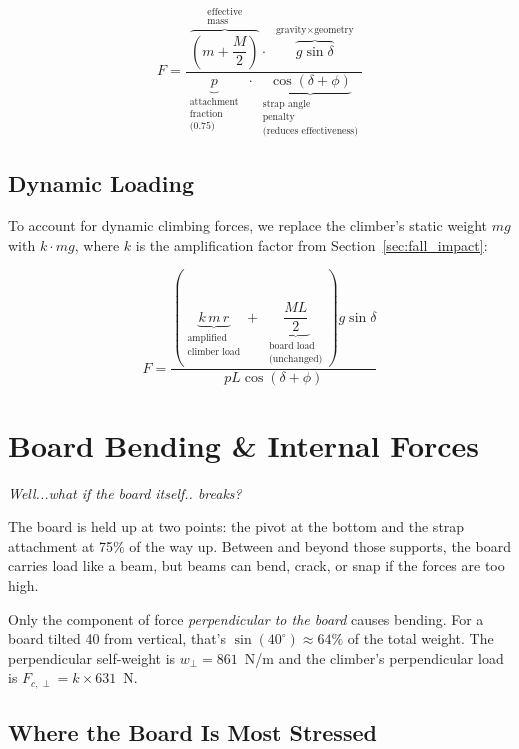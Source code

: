\documentclass[12pt]{article}
\begin{document}
\[
\boxed{
F = \frac{
\overbrace{\left(m + \dfrac{M}{2}\right)}^{\substack{\text{effective}\\\text{mass}}}
\cdot\;
\overbrace{g \sin\delta}^{\substack{\text{gravity} \times \text{geometry}}}
}{
\underbrace{p}_{\substack{\text{attachment}\\\text{fraction}\\\text{(0.75)}}}
\;\cdot\;
\underbrace{\cos(\delta+\phi)}_{\substack{\text{strap angle}\\\text{penalty}\\\text{(reduces effectiveness)}}}
}
}
\]
\newpage
\subsection{Dynamic Loading}
\label{sec:dynamic_loading}

To account for dynamic climbing forces, we replace the climber's static weight $mg$ with $k \cdot mg$, where $k$ is the amplification factor from Section~\ref{sec:fall_impact}:

\[
\boxed{
F = \frac{
\left(
\underbrace{k \, m \, r}_{\substack{\text{amplified}\\\text{climber load}}}
+\;
\underbrace{\dfrac{ML}{2}}_{\substack{\text{board load}\\\text{(unchanged)}}}
\right)
g \sin\delta
}{pL \cos(\delta+\phi)}
}
\]


\section{Board Bending \& Internal Forces}
\label{sec:bending}

\textit{Well...what if the board itself.. breaks?}

The board is held up at two points: the pivot at the bottom and the strap attachment at 75\% of the way up. Between and beyond those supports, the board carries load like a beam, but beams can bend, crack, or snap if the forces are too high.

Only the component of force \textit{perpendicular to the board} causes bending. For a board tilted 40\textdegree{} from vertical, that's $\sin(40^\circ) \approx 64\%$ of the total weight. The perpendicular self-weight is $w_\perp = 861$~N/m and the climber's perpendicular load is $F_{c,\perp} = k \times 631$~N.

\subsection{Where the Board Is Most Stressed}
\end{document}
